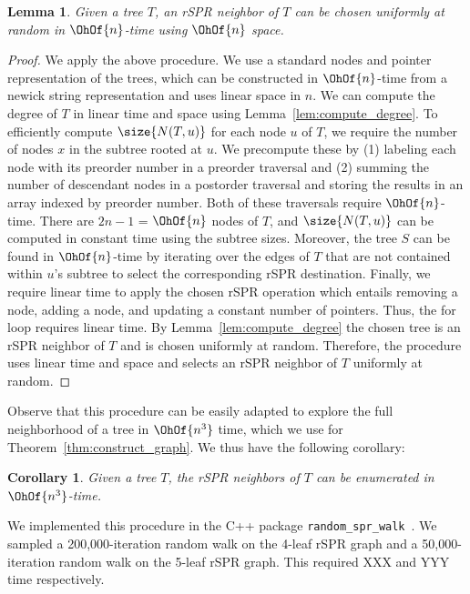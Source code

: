 \documentclass[11pt,onecolumn,conference]{IEEEtran}
\newtheorem{lemma}[theorem]{Lemma}
\newtheorem{corollary}[theorem]{Corollary}
\begin{document}
\begin{lemma}
	\label{lem:select_random_neighbor}
	Given a tree $T$, an rSPR neighbor of $T$ can be chosen uniformly at random in $\OhOf{n}$-time using $\OhOf{n}$ space.
\end{lemma}
\begin{proof}
	We apply the above procedure.
	We use a standard nodes and pointer representation of the trees, which can be constructed in $\OhOf{n}$-time from a newick string representation and uses linear space in $n$.
	We can compute the degree of $T$ in linear time and space using Lemma~\ref{lem:compute_degree}.
	To efficiently compute $\size{N(T,u)}$ for each node $u$ of $T$, we require the number of nodes $x$ in the subtree rooted at $u$.
	We precompute these by (1) labeling each node with its preorder number in a preorder traversal and (2) summing the number of descendant nodes in a postorder traversal and storing the results in an array indexed by preorder number.
	Both of these traversals require $\OhOf{n}$-time.
	There are $2n-1$ = $\OhOf{n}$ nodes of $T$, and $\size{N(T,u)}$ can be computed in constant time using the subtree sizes.
	Moreover, the tree $S$ can be found in $\OhOf{n}$-time by iterating over the edges of $T$ that are not contained within $u$'s subtree to select the corresponding rSPR destination.
	Finally, we require linear time to apply the chosen rSPR operation which entails removing a node, adding a node, and updating a constant number of pointers.
	Thus, the for loop requires linear time.
	By Lemma~\ref{lem:compute_degree} the chosen tree is an rSPR neighbor of $T$ and is chosen uniformly at random.
	Therefore, the procedure uses linear time and space and selects an rSPR neighbor of $T$ uniformly at random.
\end{proof}

Observe that this procedure can be easily adapted to explore the full neighborhood of a tree in $\OhOf{n^3}$ time, which we use for Theorem~\ref{thm:construct_graph}.
We thus have the following corollary:

\begin{corollary}
	Given a tree $T$, the rSPR neighbors of $T$ can be enumerated in $\OhOf{n^3}$-time.
\end{corollary}

We implemented this procedure in the C++ package \texttt{random\_spr\_walk}~\cite{random_spr_walk}.
We sampled a 200,000-iteration random walk on the 4-leaf rSPR graph and a 50,000-iteration random walk on the 5-leaf rSPR graph.
This required XXX and YYY time respectively.~
\end{document}
